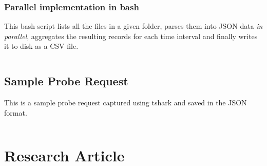 \subsection{Parallel implementation in bash}

This bash script lists all the files in a given folder, parses them into JSON data \textit{in parallel}, aggregates the resulting records for each time interval and finally writes it to disk as a CSV file.
\vspace{1em}
\inputminted{bash}{analysis/data-toolkit/new-toolkit-parallel.sh}
\pagebreak


\section{Sample Probe Request} \label{appendix:sampleprobe}
This is a sample probe request captured using tshark and saved in the JSON format.

\vspace{1em}
\inputminted{javascript}{analysis/data-collection/samplepacket.json}


\chapter{Research Article}


